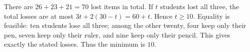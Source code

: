 There are $26+23+21=70$ lost items in total. If $t$ students lost all three, the total losses are at most $3t+2(30-t)=60+t$. Hence $t\ge10$. Equality is feasible: ten students lose all three; among the other twenty, four keep only their pen, seven keep only their ruler, and nine keep only their pencil. This gives exactly the stated losses. Thus the minimum is $\boxed{10}$.

